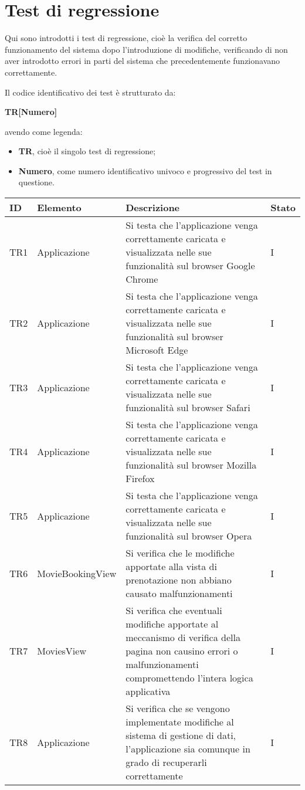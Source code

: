 \clearpage

\section{Test di regressione}\label{sec:verifica-validazione-regressione}

Qui sono introdotti i test di regressione, cioè la verifica del corretto funzionamento del sistema dopo l'introduzione di modifiche, verificando di non aver 
introdotto errori in parti del sistema che precedentemente funzionavano correttamente.

Il codice identificativo dei test è strutturato da:
\begin{center}
    \textbf{TR[Numero]}
  \end{center}
\textbf{}
avendo come legenda:
\begin{itemize}
\item \textbf{TR}, cioè il singolo test di regressione;
\item \textbf{Numero}, come numero identificativo univoco e progressivo del test in questione.
\end{itemize}

\begin{center}
\label{tab:test-regressione}
\begin{longtable}{|C{2.0cm}|C{3.0cm}|C{8.0cm}|C{2.0cm}|}
\hline
\textbf{ID} & \textbf{Elemento} & \textbf{Descrizione} & \textbf{Stato} \\
\hline
TR1 & Applicazione & Si testa che l'applicazione venga correttamente caricata e visualizzata nelle sue funzionalità sul browser Google Chrome & I \\
\hline
TR2 & Applicazione & Si testa che l'applicazione venga correttamente caricata e visualizzata nelle sue funzionalità sul browser Microsoft Edge & I \\
\hline
TR3 & Applicazione & Si testa che l'applicazione venga correttamente caricata e visualizzata nelle sue funzionalità sul browser Safari & I \\
\hline
TR4 & Applicazione & Si testa che l'applicazione venga correttamente caricata e visualizzata nelle sue funzionalità sul browser Mozilla Firefox & I \\
\hline
TR5 & Applicazione & Si testa che l'applicazione venga correttamente caricata e visualizzata nelle sue funzionalità sul browser Opera & I \\
\hline
TR6 & MovieBookingView & Si verifica che le modifiche apportate alla vista di prenotazione non abbiano causato malfunzionamenti & I \\
\hline
TR7 & MoviesView & Si verifica che eventuali modifiche apportate al meccanismo di verifica della pagina non causino errori o malfunzionamenti compromettendo l'intera logica applicativa & I \\
\hline
TR8 & Applicazione & Si verifica che se vengono implementate modifiche al sistema di gestione di dati, l'applicazione sia comunque in grado di recuperarli correttamente & I \\
\hline
\end{longtable}
\end{center}

